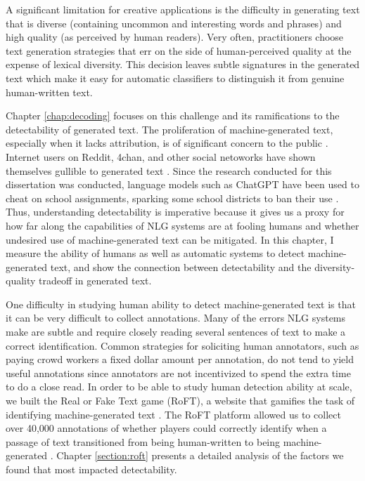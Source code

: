 A significant limitation for creative applications is the difficulty in generating text that is diverse (containing uncommon and interesting words and phrases) and high quality (as perceived by human readers).
Very often, practitioners choose text generation strategies that err on the side of human-perceived quality at the expense of lexical diversity.
This decision leaves subtle signatures in the generated text which make it easy for automatic classifiers to distinguish it from genuine human-written text.

Chapter \ref{chap:decoding} focuses on this challenge and its ramifications to the detectability of generated text.
The proliferation of machine-generated text, especially when it lacks attribution, is of significant concern to the public \citep{vincent2019openai}.
Internet users on Reddit, 4chan, and other social netoworks have shown themselves gullible to generated text \citep{heaven2020gpt,chatgptfourchan}.
Since the research conducted for this dissertation was conducted, language models such as ChatGPT have been used to cheat on school assignments, sparking some school districts to ban their use \citep{chatgptban}.
Thus, understanding detectability is imperative because it gives us a proxy for how far along the capabilities of NLG systems are at fooling humans and whether undesired use of machine-generated text can be mitigated.
In this chapter, I measure the ability of humans as well as automatic systems to detect machine-generated text, and show the connection between detectability and the diversity-quality tradeoff in generated text.


One difficulty in studying human ability to detect machine-generated text is that it can be very difficult to collect annotations.
Many of the errors NLG systems make are subtle and require closely reading several sentences of text to make a correct identification.
Common strategies for soliciting human annotators, such as paying crowd workers a fixed dollar amount per annotation, do not tend to yield useful annotations since annotators are not incentivized to spend the extra time to do a close read.
In order to be able to study human detection ability at scale, we built the Real or Fake Text game (RoFT), a website that gamifies the task of identifying machine-generated text \citep{dugan2020roft}.
The RoFT platform allowed us to collect over 40,000 annotations of whether players could correctly identify when a passage of text transitioned from being human-written to being machine-generated .
Chapter \ref{section:roft} presents a detailed analysis of the factors we found that most impacted detectability. 
 
